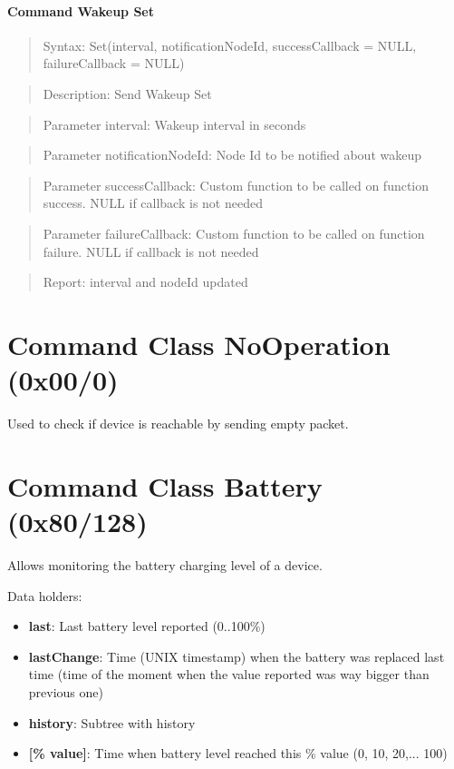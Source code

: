 \paragraph{Command Wakeup Set}
\begin{quote}Syntax: Set(interval, notificationNodeId, successCallback = NULL, failureCallback = NULL)\end{quote}
\begin{quote}Description: Send Wakeup Set\end{quote}
\begin{quote}Parameter interval: Wakeup interval in seconds\end{quote}
\begin{quote}Parameter notificationNodeId: Node Id to be notified about wakeup\end{quote}
\begin{quote}Parameter successCallback: Custom function to be called on function success. NULL if callback is not needed\end{quote}
\begin{quote}Parameter failureCallback: Custom function to be called on function failure. NULL if callback is not needed\end{quote}
\begin{quote}Report: interval and nodeId updated\end{quote}


\section{Command Class NoOperation (0x00/0)}

Used to check if device is reachable by sending empty packet.

\section{Command Class Battery (0x80/128)}

Allows monitoring the battery charging level of a device.
\newline

\noindent
Data holders:

\begin{itemize}
\item \textbf{last}: Last battery level reported (0..100\%)
\item \textbf{lastChange}: Time (UNIX timestamp) when the battery was replaced last time (time of the moment when the value reported was way bigger than previous one)
\item \textbf{history}: Subtree with history
\item \qquad\textbf{[\% value]}: Time when battery level reached this \% value (0, 10, 20,... 100)
\end{itemize}

